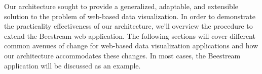 %
%

Our architecture sought to provide a generalized, adaptable, and extensible solution to the problem of web-based data visualization.  In order to demonstrate the practicality effectiveness of our architecture, we’ll overview the procedure to extend the Beestream web application.  The following sections will cover different common avenues of change for web-based data visualization applications and how our architecture accommodates these changes.  In most cases, the Beestream application will be discussed as an example. \par
